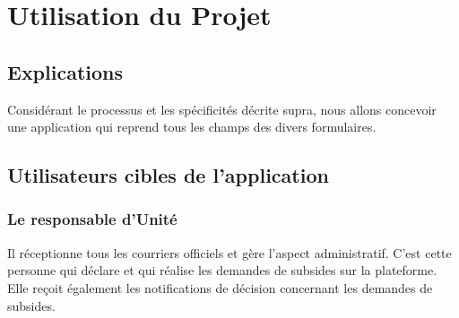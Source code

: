 \section{Utilisation du Projet}
\subsection{Explications}
Considérant le processus et les spécificités décrite supra, nous allons concevoir une application qui reprend tous les champs des divers formulaires. 






\subsection{Utilisateurs cibles de l'application}

\subsubsection{Le responsable d'Unité} Il réceptionne tous les courriers officiels et gère l'aspect administratif. C'est cette personne qui déclare et qui réalise les demandes de subsides sur la plateforme. Elle reçoit également les notifications de décision concernant les demandes de subsides. 

